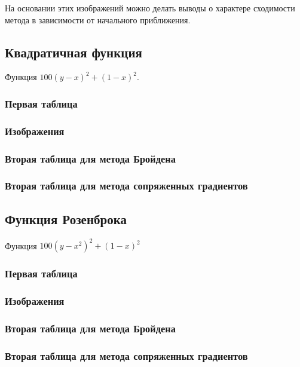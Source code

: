 На основании этих изображений можно делать выводы о характере сходимости метода в зависимости от начального приближения.

\subsection{Квадратичная функция}

Функция $100(y-x)^2+(1-x)^2$.

\subsubsection{Первая таблица}
\subsubsection{Изображения}
\subsubsection{Вторая таблица для метода Бройдена}
\subsubsection{Вторая таблица для метода сопряженных градиентов}

\subsection{Функция Розенброка}
Функция $100(y-x^2)^2+(1-x)^2$

\subsubsection{Первая таблица}
\subsubsection{Изображения}
\subsubsection{Вторая таблица для метода Бройдена}
\subsubsection{Вторая таблица для метода сопряженных градиентов}

